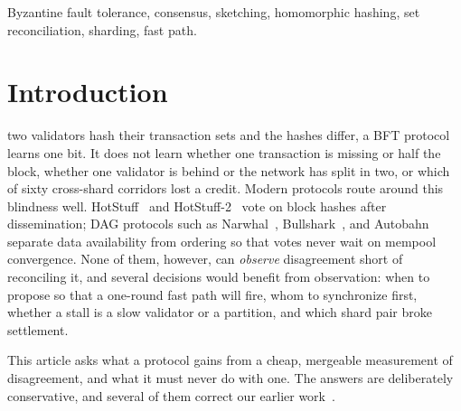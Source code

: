 \documentclass[journal]{IEEEtran}
\begin{document}
\begin{IEEEkeywords}
Byzantine fault tolerance, consensus, sketching, homomorphic hashing,
set reconciliation, sharding, fast path.
\end{IEEEkeywords}

\IEEEpeerreviewmaketitle

\section{Introduction}
\label{sec:intro}

 two validators hash their transaction sets and
the hashes differ, a BFT protocol learns one bit. It does not learn
whether one transaction is missing or half the block, whether one
validator is behind or the network has split in two, or which of sixty
cross-shard corridors lost a credit. Modern protocols route around this
blindness well. HotStuff~\cite{yin2019hotstuff} and
HotStuff-2~\cite{malkhi2023hotstuff2} vote on block hashes after
dissemination; DAG protocols such as Narwhal~\cite{narwhal},
Bullshark~\cite{bullshark}, and Autobahn~\cite{giridharan2024autobahn}
separate data availability from ordering so that votes never wait on
mempool convergence. None of them, however, can \emph{observe}
disagreement short of reconciling it, and several decisions would
benefit from observation: when to propose so that a one-round fast path
will fire, whom to synchronize first, whether a stall is a slow
validator or a partition, and which shard pair broke settlement.

This article asks what a protocol gains from a cheap, mergeable
measurement of disagreement, and what it must never do with one. The
answers are deliberately conservative, and several of them correct our
earlier work~\cite{mercier2026proxima}.
\end{document}
